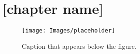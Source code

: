 

\setcounter{chapter}{0}
\renewcommand\thechapter{\Alph{chapter}}

\captionsetup[table]{list=no}
\captionsetup[figure]{list=no}

\begingroup
\renewcommand{\cleardoublepage}{}
\renewcommand{\clearpage}{}
\vspace*{-5em}

\chapter{[chapter name]}
\label{ch:appendix}

\vspace*{-1em}
\begin{figure}[H]
\centering
\captionsetup{justification=centering}
\texttt{[image: Images/placeholder]}
\caption[Caption that appears in the table of contents]{Caption that appears below the figure.}
\label{fig:figure}
\vspace{-0.5em}
\end{figure}

\endgroup